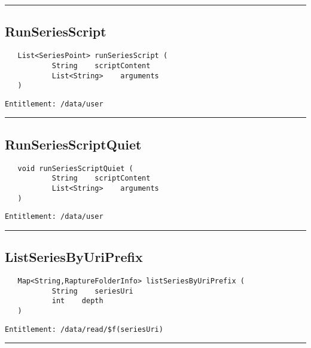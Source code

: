 \rule{12cm}{2pt}
\subsection{RunSeriesScript}
\label{Api:RunSeriesScript}
\begin{verbatim}
   List<SeriesPoint> runSeriesScript (
           String    scriptContent
           List<String>    arguments
   )
\end{verbatim}
\begin{Verbatim}[fontsize=\small, formatcom=\color{Maroon}]
  Entitlement: /data/user
\end{Verbatim}



\rule{12cm}{2pt}
\subsection{RunSeriesScriptQuiet}
\label{Api:RunSeriesScriptQuiet}
\begin{verbatim}
   void runSeriesScriptQuiet (
           String    scriptContent
           List<String>    arguments
   )
\end{verbatim}
\begin{Verbatim}[fontsize=\small, formatcom=\color{Maroon}]
  Entitlement: /data/user
\end{Verbatim}



\rule{12cm}{2pt}
\subsection{ListSeriesByUriPrefix}
\label{Api:ListSeriesByUriPrefix}
\begin{verbatim}
   Map<String,RaptureFolderInfo> listSeriesByUriPrefix (
           String    seriesUri
           int    depth
   )
\end{verbatim}
\begin{Verbatim}[fontsize=\small, formatcom=\color{Maroon}]
  Entitlement: /data/read/$f(seriesUri)
\end{Verbatim}



\rule{12cm}{2pt}
